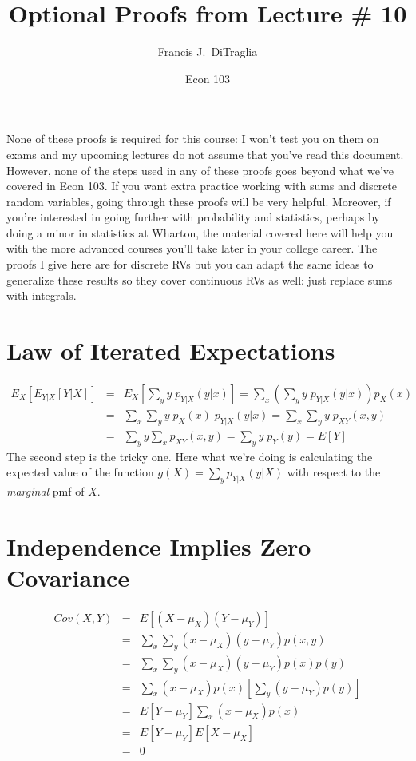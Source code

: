 \documentclass[12pt]{article}
\title{Optional Proofs from Lecture \# 10}
\author{Francis J.\ DiTraglia}
\date{Econ 103}
\begin{document}
\maketitle

\noindent None of these proofs is required for this course: I won't test you on them on exams and my upcoming lectures do not assume that you've read this document.
However, none of the steps used in any of these proofs goes beyond what we've covered in Econ 103.
If you want extra practice working with sums and discrete random variables, going through these proofs will be very helpful.
Moreover, if you're interested in going further with probability and statistics, perhaps by doing a minor in statistics at Wharton, the material covered here will help you with the more advanced courses you'll take later in your college career.
The proofs I give here are for discrete RVs but you can adapt the same ideas to generalize these results so they cover continuous RVs as well: just replace sums with integrals.

\section*{Law of Iterated Expectations}

\begin{eqnarray*}
	E_X\left[ E_{Y|X}\left[Y|X\right] \right] &=&E_X\left[ \sum_y y \; p_{Y|X}(y|x)\right] = \sum_x \left( \sum_y y \; p_{Y|X}(y|x)\right) p_X(x) \\
		&=& \sum_x \sum_y y \; p_X(x) \; p_{Y|X}(y|x) = \sum_x \sum_y y \; p_{XY}(x,y)\\
		&=& \sum_y y \sum_x p_{XY}(x,y) = \sum_y y \;p_Y(y) = E[Y]
\end{eqnarray*}
The second step is the tricky one. Here what we're doing is calculating the expected value of the function $g(X) = \sum_y p_{Y|X}(y|X)$ with respect to the \emph{marginal} pmf of $X$. 

\section*{Independence Implies Zero Covariance}
\begin{eqnarray*}
	Cov(X,Y) &=& E[(X-\mu_X)(Y-\mu_Y)]\\
	&=& \sum_x \sum_y (x - \mu_X)(y- \mu_Y)p(x,y)\\
	&=&\sum_x \sum_y (x - \mu_X)(y- \mu_Y)p(x)p(y) \\
	&=& \sum_x  (x - \mu_X)p(x)\left[ \sum_y (y- \mu_Y)p(y)\right] \\
	&=& E[Y- \mu_Y] \sum_x  (x - \mu_X)p(x)\\
	&=& E[Y- \mu_Y]E[X- \mu_X] \\
	&=& 0
\end{eqnarray*}
\end{document}
